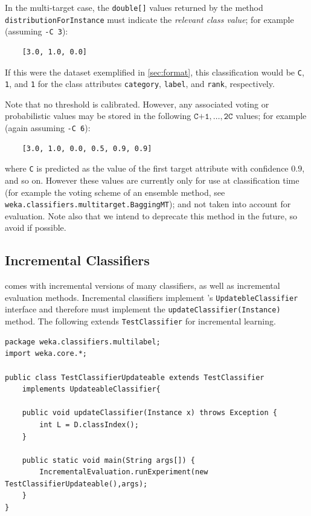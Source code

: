 \documentclass[11pt]{article}
\newcommand{\MEKA}{Meka}
\newcommand{\WEKA}{Weka}
\begin{document}

In the multi-target case, the \texttt{double[]} values returned by the method \texttt{distributionForInstance} must indicate the \emph{relevant class value}; for example (assuming \texttt{-C 3}): 
\begin{verbatim}
	[3.0, 1.0, 0.0]
\end{verbatim} 
If this were the dataset exemplified in \ref{sec:format}, this classification would be \texttt{C}, \texttt{1}, and \texttt{1} for the class attributes \texttt{category}, \texttt{label}, and \texttt{rank}, respectively.

Note that no threshold is calibrated. However, any associated voting or probabilistic values may be stored in the following $\texttt{C+1},\ldots,\texttt{2C}$ values; for example (again assuming \texttt{-C 6}):
\begin{verbatim}
	[3.0, 1.0, 0.0, 0.5, 0.9, 0.9]
\end{verbatim} 
where \texttt{C} is predicted as the value of the first target attribute with confidence $0.9$, and so on. However these values are currently only for use at classification time (for example the voting scheme of an ensemble method, see \texttt{weka.classifiers.multitarget.BaggingMT}); and not taken into account for evaluation. Note also that we intend to deprecate this method in the future, so avoid if possible.

\subsection{Incremental Classifiers}

\framework{\MEKA} comes with incremental versions of many classifiers, as well as incremental evaluation methods. Incremental classifiers implement \framework{\WEKA}'s \texttt{UpdatebleClassifier} interface and therefore must implement the \texttt{updateClassifier(Instance)} method. The following extends \texttt{TestClassifier} for incremental learning.

{\small
\begin{verbatim}
package weka.classifiers.multilabel;
import weka.core.*;

public class TestClassifierUpdateable extends TestClassifier 
    implements UpdateableClassifier{
	
    public void updateClassifier(Instance x) throws Exception {
        int L = D.classIndex();
    }
    
    public static void main(String args[]) {
        IncrementalEvaluation.runExperiment(new TestClassifierUpdateable(),args);
    }
}
\end{verbatim}
}
\end{document}
